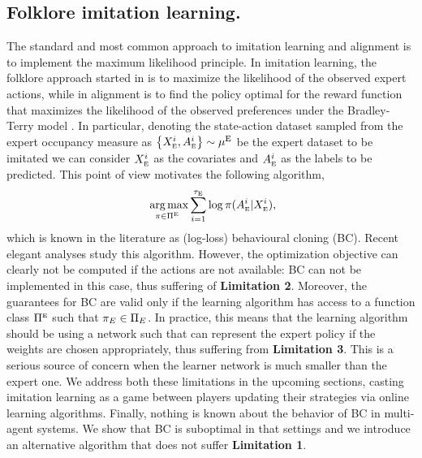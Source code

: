 \documentclass{article}
\begin{document}
\subsection{Folklore imitation learning.}
The standard and most common approach to imitation learning and alignment is to implement the maximum likelihood principle. 
In imitation learning, the folklore approach started in \citep{Pomerleau:1991} is to maximize the likelihood of the observed expert actions, while in alignment
is to find the policy optimal for the reward function that maximizes the likelihood of the observed preferences 
under the Bradley-Terry model \citep{bradley1952rank}.
 In particular, denoting the state-action dataset sampled from the expert occupancy measure as $\left\{{X_{\scriptscriptstyle\textup{E}}^i,A_{\scriptscriptstyle\textup{E}}^i}\right\} \sim \mu^{\operatorname{E}}$ be the expert dataset to be imitated we can consider $X_{\scriptscriptstyle\textup{E}}^i$ as the covariates and $A_{\scriptscriptstyle\textup{E}}^i$ as the labels to be predicted. This point of view motivates the following algorithm,
\[
\mathop{\mbox{ arg\,max}}_{\pi \in {\Pi^{\scriptscriptstyle\textup{E}}}} \sum^{\tau_{\scriptscriptstyle\textup{E}}}_{i=1} \log \pi(A_{\scriptscriptstyle\textup{E}}^i|X_{\scriptscriptstyle\textup{E}}^i),
\]
which is known in the literature as (log-loss) behavioural cloning (BC).
Recent elegant analyses \citep{rajaraman2020toward,foster2024behavior,rohatgi2025computational} study this algorithm.
However, the optimization objective can clearly not be computed if the actions are not available: BC can not be implemented in this case, thus suffering of \textbf{Limitation 2}. Moreover, the guarantees for BC \citep{foster2024behavior} are valid only if the 
learning algorithm has access to a function class ${\Pi^{\scriptscriptstyle\textup{E}}}$ such that ${\pi_E} \in \Pi_E$. In practice, this means that the learning algorithm should be using 
a network such that can represent the expert policy if the weights are chosen appropriately, thus suffering from \textbf{Limitation 3}. This is a serious source of concern when the learner network is much smaller than the expert one. 
We address both these limitations in the upcoming sections, casting imitation learning as a game between players updating their strategies via online learning algorithms.
Finally, nothing is known about the behavior of BC in multi-agent systems. We show that BC is suboptimal in that settings and we introduce an alternative algorithm that does not suffer \textbf{Limitation 1}.
\end{document}
